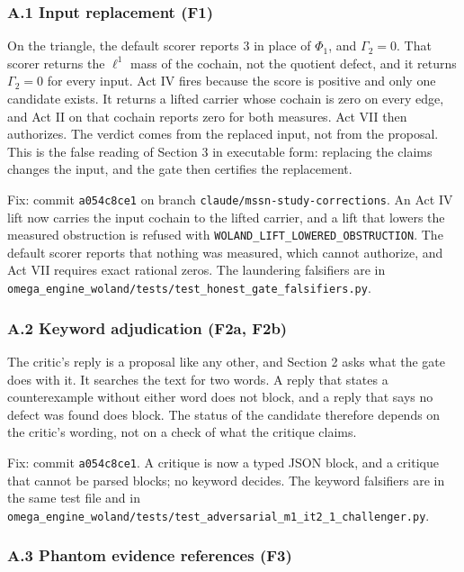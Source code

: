 \documentclass[
  11pt,
]{article}
\newcommand{\passthrough}[1]{#1}
\begin{document}
\subsubsection{A.1 Input replacement
(F1)}\label{a.1-input-replacement-f1}

On the triangle, the default scorer reports 3 in place of \(\Phi_1\),
and \(\Gamma_2 = 0\). That scorer returns the \(\ell^1\) mass of the
cochain, not the quotient defect, and it returns \(\Gamma_2 = 0\) for
every input. Act IV fires because the score is positive and only one
candidate exists. It returns a lifted carrier whose cochain is zero on
every edge, and Act II on that cochain reports zero for both measures.
Act VII then authorizes. The verdict comes from the replaced input, not
from the proposal. This is the false reading of Section 3 in executable
form: replacing the claims changes the input, and the gate then
certifies the replacement.

Fix: commit \passthrough{\lstinline!a054c8ce1!} on branch
\nolinkurl{claude/mssn-study-corrections}. An Act IV lift now carries
the input cochain to the lifted carrier, and a lift that lowers the
measured obstruction is refused with
\nolinkurl{WOLAND_LIFT_LOWERED_OBSTRUCTION}. The default scorer reports
that nothing was measured, which cannot authorize, and Act VII requires
exact rational zeros. The laundering falsifiers are in
\nolinkurl{omega_engine_woland/tests/test_honest_gate_falsifiers.py}.

\subsubsection{A.2 Keyword adjudication (F2a,
F2b)}\label{a.2-keyword-adjudication-f2a-f2b}

The critic's reply is a proposal like any other, and Section 2 asks what
the gate does with it. It searches the text for two words. A reply that
states a counterexample without either word does not block, and a reply
that says no defect was found does block. The status of the candidate
therefore depends on the critic's wording, not on a check of what the
critique claims.

Fix: commit \passthrough{\lstinline!a054c8ce1!}. A critique is now a
typed JSON block, and a critique that cannot be parsed blocks; no
keyword decides. The keyword falsifiers are in the same test file and in
\nolinkurl{omega_engine_woland/tests/test_adversarial_m1_it2_1_challenger.py}.

\subsubsection{A.3 Phantom evidence references
(F3)}\label{a.3-phantom-evidence-references-f3}
\end{document}
